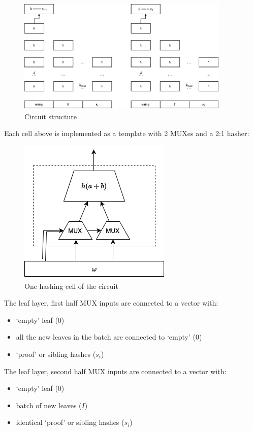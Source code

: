 \documentclass[twocolumn]{article}
\begin{document}
\begin{figure}[!t]
    \centering
    \includegraphics[width=0.9\textwidth]{pic/smt-circuit.drawio}
    \caption{Circuit structure}\label{fi:smt-circuit}
\end{figure}

Each cell above is implemented as a template with 2 MUXes and a 2:1 hasher:

\begin{figure}[t]
    \centering
    \includegraphics[width=.6\columnwidth]{pic/smt-circuit-cell.drawio}
    \caption{One hashing cell of the circuit}\label{fi:smt-circuit-cell}
\end{figure}


The leaf layer, first half MUX inputs are connected to a vector with:
\begin{itemize}
    \item `empty' leaf ($0$)
    \item all the new leaves in the batch are connected to `empty' ($0$)
    \item `proof' or sibling hashes ($s_i$)
\end{itemize}

The leaf layer, second half MUX inputs are connected to a vector with:
\begin{itemize}
    \item `empty' leaf ($0$)
    \item batch of new leaves ($I$)
    \item identical `proof' or sibling hashes ($s_i$)
\end{itemize}
\end{document}
